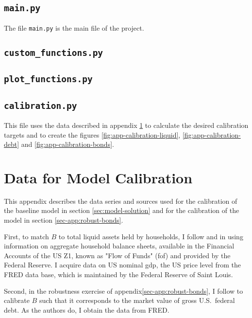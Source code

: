 \documentclass[a4paper,12pt]{article} %
\numberwithin{equation}{section} %
\numberwithin{figure}{section}
\numberwithin{table}{section}
\begin{document}
\begin{refsection}
\begin{appendices}
\subsection*{\texttt{main.py}}

The file \texttt{main.py} is the main file of the project.

\subsection*{\texttt{custom\_functions.py}}

\subsection*{\texttt{plot\_functions.py}}

\subsection*{\texttt{calibration.py}}

This file uses the data described in appendix \ref{sec-app:data} to calculate the desired calibration targets and to create the figures \ref{fig:app-calibration-liquid}, \ref{fig:app-calibration-debt} and \ref{fig:app-calibration-bonds}.

\section{Data for Model Calibration}
\label{sec-app:data}

This appendix describes the data series and sources used for the calibration of the baseline model in section \ref{sec:model-solution} and for the calibration of the model in section \ref{sec-app:robust-bonds}.

First, to match $B$ to total liquid assets held by households, I follow \textcite{mckay2016} and \textcite{gl2017} in using information on aggregate household balance sheets, available in the Financial Accounts of the US Z1, known as "Flow of Funds" (\Gls{fof}) and provided by the Federal Reserve. I acquire data on US nominal \Gls{gdp}, the US price level from the FRED data base, which is maintained by the Federal Reserve of Saint Louis. 

Second, in the robustness exercise of appendix\ref{sec-app:robust-bonds}, I follow \textcite{bayer2023} to calibrate $B$ such that it corresponds to the market value of gross U.S.~federal debt. As the authors do, I obtain the data from FRED.


\end{appendices}
\end{refsection}
\end{document}
